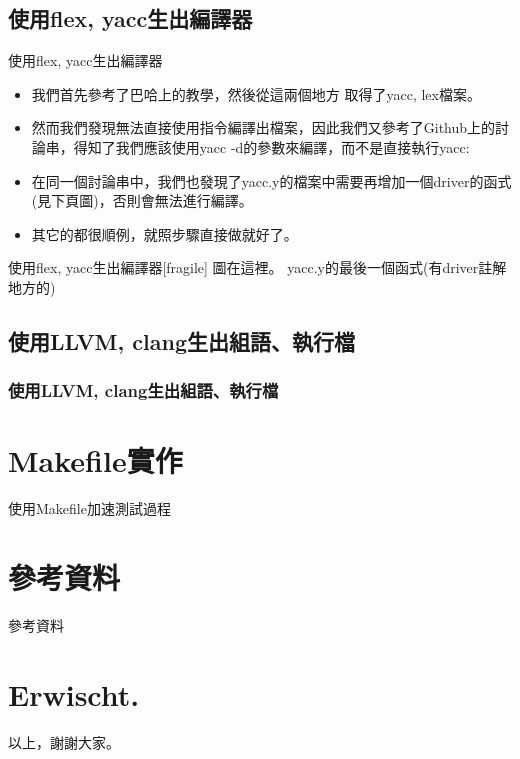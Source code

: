 \documentclass{beamer}
\begin{document}
\subsection{使用flex, yacc生出編譯器}
\begin{frame}{使用flex, yacc生出編譯器}
\begin{itemize}
    \item 我們首先參考了巴哈上的教學\cite{Lex}，然後從這兩個地方\cite{ANSILex} \cite{ANSIYacc}取得了yacc, lex檔案。
    \item 然而我們發現無法直接使用指令編譯出檔案，因此我們又參考了Github上的討論串\cite{C99Grammars}，得知了我們應該使用yacc -d的參數來編譯，而不是直接執行yacc: 
    \item 在同一個討論串中，我們也發現了yacc.y的檔案中需要再增加一個driver的函式(見下頁圖)，否則會無法進行編譯。
    \item 其它的都很順例，就照步驟直接做就好了。
\end{itemize}
\end{frame}

\begin{frame}{使用flex, yacc生出編譯器}[fragile]
    圖在這裡。 yacc.y的最後一個函式(有driver註解地方的)
\end{frame}

\subsection{使用LLVM, clang生出組語、執行檔}
\begin{frame}
    \frametitle{使用LLVM, clang生出組語、執行檔}
\end{frame}

\section{Makefile實作}
\begin{frame}{使用Makefile加速測試過程}

\end{frame}

\section{參考資料}
\begin{frame}{參考資料}
    
  
\end{frame}

\section{Erwischt.}
\begin{frame}{以上，謝謝大家。}
    
\end{frame}
\end{document}
